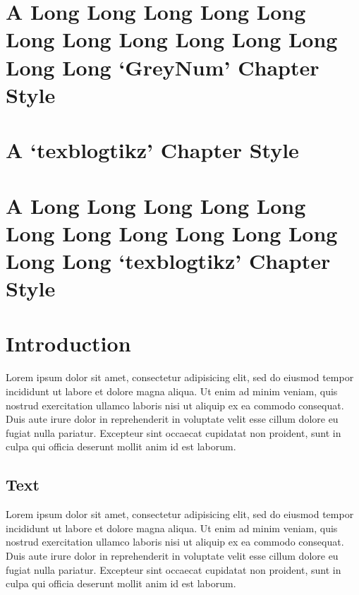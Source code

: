 \documentclass[10pt,a4paper,extrafontsizes,oldfontcommands,oneside]{memoir}
\begin{document}
\chapter{A Long Long Long Long Long Long Long Long Long Long Long Long Long `GreyNum' Chapter Style} %
\label{chap:a_long_GreyNum_chapter_style}



\chapter{A `texblogtikz' Chapter Style} %
\label{chap:a_texblogtikz_chapter_style}



\chapter{A Long Long Long Long Long Long Long Long Long Long Long Long Long `texblogtikz' Chapter Style} %
\label{chap:a_long_texblogtikz_chapter_style}



\chapter{Introduction}

Lorem ipsum dolor sit amet, consectetur adipisicing elit, sed do eiusmod tempor incididunt ut labore et dolore magna aliqua. Ut enim ad minim veniam, quis nostrud exercitation ullamco laboris nisi ut aliquip ex ea commodo consequat. Duis aute irure dolor in reprehenderit in voluptate velit esse cillum dolore eu fugiat nulla pariatur. Excepteur sint occaecat cupidatat non proident, sunt in culpa qui officia deserunt mollit anim id est laborum.

\section{Text} %
\label{sec:text}


Lorem ipsum dolor sit amet, consectetur adipisicing elit, sed do eiusmod tempor incididunt ut labore et dolore magna aliqua. Ut enim ad minim veniam, quis nostrud exercitation ullamco laboris nisi ut aliquip ex ea commodo consequat. Duis aute irure dolor in reprehenderit in voluptate velit esse cillum dolore eu fugiat nulla pariatur. Excepteur sint occaecat cupidatat non proident, sunt in culpa qui officia deserunt mollit anim id est laborum.
\end{document}
